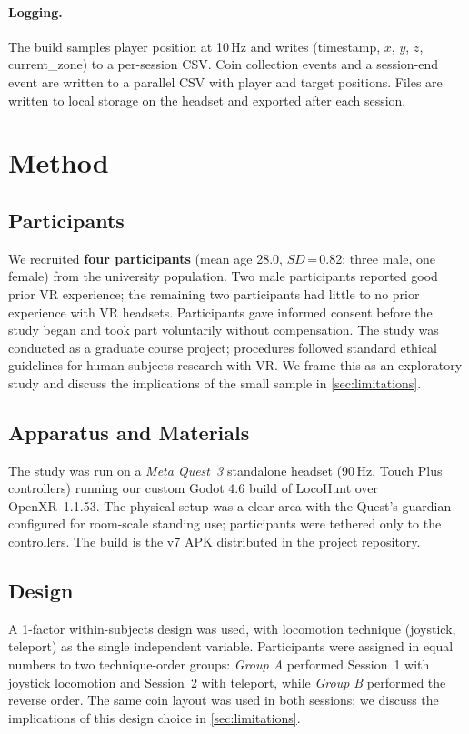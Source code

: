 \documentclass{vgtc}
\begin{document}
\paragraph{Logging.} The build samples player position at 10\,Hz and writes (timestamp, $x$, $y$, $z$, current\_zone) to a per-session CSV. Coin collection events and a session-end event are written to a parallel CSV with player and target positions. Files are written to local storage on the headset and exported after each session.

\section{Method}

\subsection{Participants}
We recruited \textbf{four participants} (mean age 28.0, $SD$\,=\,0.82; three male, one female) from the university population. Two male participants reported good prior VR experience; the remaining two participants had little to no prior experience with VR headsets. Participants gave informed consent before the study began and took part voluntarily without compensation. The study was conducted as a graduate course project; procedures followed standard ethical guidelines for human-subjects research with VR. We frame this as an exploratory study and discuss the implications of the small sample in \autoref{sec:limitations}.

\subsection{Apparatus and Materials}
The study was run on a \emph{Meta Quest~3} standalone headset (90\,Hz, Touch Plus controllers) running our custom Godot 4.6 build of LocoHunt over OpenXR~1.1.53. The physical setup was a clear area with the Quest's guardian configured for room-scale standing use; participants were tethered only to the controllers. The build is the v7 APK distributed in the project repository.

\subsection{Design}
A 1-factor within-subjects design was used, with locomotion technique (joystick, teleport) as the single independent variable. Participants were assigned in equal numbers to two technique-order groups: \emph{Group A} performed Session~1 with joystick locomotion and Session~2 with teleport, while \emph{Group B} performed the reverse order. The same coin layout was used in both sessions; we discuss the implications of this design choice in \autoref{sec:limitations}.
\end{document}
